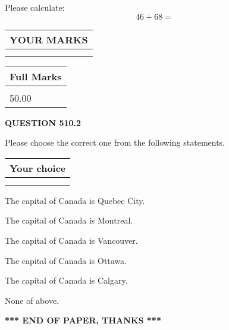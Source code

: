 \documentclass[12pt]{article}
\begin{document}
  
 
Please calculate:
\begin{equation}
46 +  %
68 = \nonumber
\end{equation}
 

 

 
  
\vspace{0.2in}
  
\noindent\begin{tabular}{|l|}
\hline
 YOUR MARKS  \\
\hline
 \\ 
 \\ 
\hline
\end{tabular}
\hspace{0.05in} \begin{tabular}{|l|}
\hline
 Full Marks  \\
\hline
 \\ 
50.00 \\
\hline
\end{tabular}
{\textbf{\Large{QUESTION
510.2 
}}}
  
  
Please choose the correct one from the following statements.
  
  
\noindent\hspace{3.0in} \begin{tabular}{|l|}
\hline
Your choice \\
\hline
 \\ 
 \\ 
\hline
\end{tabular}
  
  
 
 
The capital of Canada is Quebec City.
 
 
The capital of Canada is Montreal.
 
 
The capital of Canada is Vancouver.
 
 
The capital of Canada is Ottawa.
 
 
The capital of Canada is Calgary.
 
 
 None of above.
 
 
   
   
 \vspace{0.2in}
 
   
   
   
   
\vspace{1.0in} 
{\textbf{\large{ *** END OF PAPER, THANKS *** }}} 
   
\end{document}
